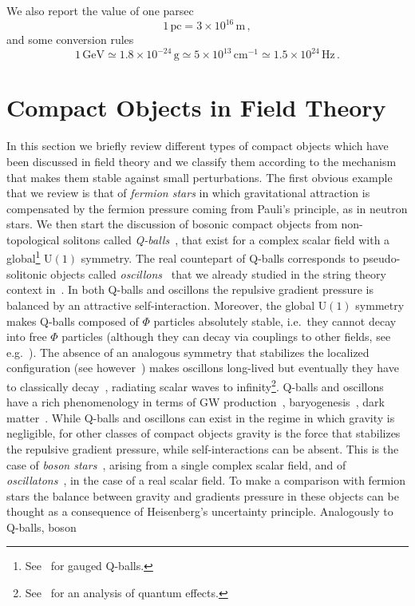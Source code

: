 \documentclass[11pt,a4paper]{article}
\begin{document}
We also report the value of one parsec
\begin{equation}
1 \, \text{pc} = 3 \times 10^{16} \, \text{m} \,,
\end{equation}
and some conversion rules
\begin{equation}
1 \, \text{GeV} \simeq 1.8 \times 10^{-24}  \, \text{g} \simeq 5 \times 10^{13} \, \text{cm}^{-1} \simeq 1.5 \times 10^{24} \, \text{Hz} \,.
\end{equation}
 
\section{Compact Objects in Field Theory}
\label{sec:bosonstarsinfieldtheory}

In this section we briefly review different types of compact objects which have been discussed in field theory and we classify them according to the mechanism that makes them stable against small perturbations. The first obvious example that we review is that of \textit{fermion stars} in which gravitational attraction is compensated by the fermion pressure coming from Pauli's principle, as in neutron stars. We then start the discussion of bosonic compact objects from non-topological solitons called \textit{Q-balls}~\cite{Coleman:1985ki, Lee:1991ax}, that exist for a complex scalar field with a global\footnote{See~\cite{Rosen, Lee:1988ag, Kusenko:1997vi} for gauged Q-balls.} U$(1)$ symmetry. The real countepart of Q-balls corresponds to pseudo-solitonic objects called \textit{oscillons}~\cite{Gleiser:1993pt} that we already studied in the string theory context in~\cite{Antusch:2017flz}. In both Q-balls and oscillons the repulsive gradient pressure is balanced by an attractive self-interaction. Moreover, the global U$(1)$ symmetry makes Q-balls composed of $\Phi$ particles absolutely stable, i.e.~they cannot decay into free $\Phi$ particles (although they can decay via couplings to other fields, see e.g.~\cite{Cohen:1986ct}). The absence of an analogous symmetry that stabilizes the localized configuration (see however~\cite{Mukaida:2016hwd}) makes oscillons long-lived but eventually they have to classically decay~\cite{Segur:1987mg, Fodor:2009kf}, radiating scalar waves to infinity\footnote{See~\cite{Hertzberg:2010yz} for an analysis of quantum effects.}. Q-balls and oscillons have a rich phenomenology in terms of GW production~\cite{Zhou:2013tsa, Antusch:2016con, Antusch:2017flz, Amin:2018xfe}, baryogenesis~\cite{Riotto:1999yt, Dine:2003ax, Buchmuller:2005eh, Lozanov:2014zfa}, dark matter~\cite{Kusenko:1997si, Burgess:2000yq}. While Q-balls and oscillons can exist in the regime in which gravity is negligible, for other classes of compact objects gravity is the force that stabilizes the repulsive gradient pressure, while self-interactions can be absent. This is the case of \textit{boson stars}~\cite{Kaup:1968zz, Ruffini:1969qy}, arising from a single complex scalar field, and of \textit{oscillatons}~\cite{Seidel:1991zh}, in the case of a real scalar field. To make a comparison with fermion stars the balance between gravity and gradients pressure in these objects can be thought as a consequence of Heisenberg's uncertainty principle. Analogously to Q-balls, boson 
\end{document}
